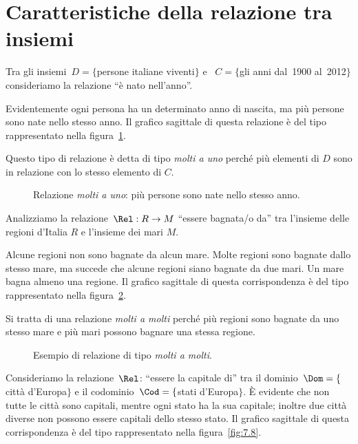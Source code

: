 \section{Caratteristiche della relazione tra insiemi}
\begin{exrig}
\begin{esempio}
Tra gli insiemi~$D= \{$persone italiane viventi$\}$ e ~$C= \{$gli anni dal~1900 al~2012$\}$ consideriamo la relazione ``è nato nell'anno''.

Evidentemente ogni persona ha un determinato anno di nascita, ma più persone sono nate nello stesso anno.
Il grafico sagittale di questa relazione è del tipo rappresentato nella figura~\ref{fig:7.6}.

Questo tipo di relazione è detta di tipo \emph{molti a uno} perché più elementi di $D$ sono in relazione con lo stesso elemento di $C$.
\end{esempio}
\begin{figure}[hb]
 \centering
 \caption{Relazione \emph{molti a uno}: più persone sono nate nello stesso anno.}\label{fig:7.6}
\end{figure}

\begin{esempio}
Analizziamo la relazione~$\Rel:R \rightarrow M$ ``essere bagnata/o da'' tra l'insieme delle regioni d'Italia $R$ e l'insieme dei mari $M$.

Alcune regioni non sono bagnate da alcun mare. Molte regioni sono bagnate dallo stesso mare, ma succede che alcune regioni siano bagnate da due mari.
Un mare bagna almeno una regione. Il grafico sagittale di questa corrispondenza è del tipo rappresentato nella
figura~\ref{fig:7.7}.

Si tratta di una relazione \emph{molti a molti} perché più regioni sono bagnate da uno stesso mare e più mari possono bagnare una stessa regione.
\begin{figure}[hb]
 \centering
 \caption{Esempio di relazione di tipo \emph{molti a molti}.}\label{fig:7.7}
\end{figure}
\end{esempio}

 \begin{esempio}
Consideriamo la relazione~$\Rel$: ``essere la capitale di'' tra il dominio~$\Dom= \{$città d'Europa$\}$ e il codominio~$\Cod= \{$stati d'Europa$\}$. È evidente che non tutte le città sono capitali, mentre ogni stato ha la sua capitale; inoltre due città diverse non possono essere capitali dello stesso stato.
Il grafico sagittale di questa corrispondenza è del tipo rappresentato nella
figura~\ref{fig:7.8}.


\end{esempio}
\end{exrig}
